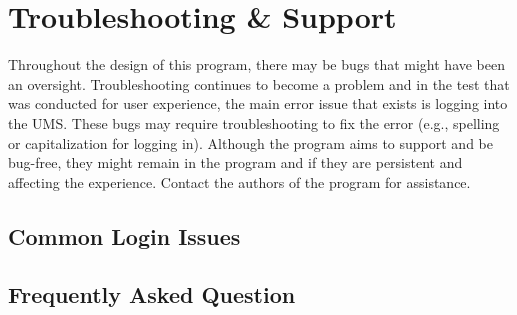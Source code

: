 \newpage
\section{Troubleshooting \& Support}

Throughout the design of this program, there may be bugs that might have been an oversight. Troubleshooting continues to become a problem and in the test that was conducted for user experience, the main error issue that exists is logging into the UMS.  These bugs may require troubleshooting to fix the error (e.g., spelling or capitalization for logging in). Although the program aims to support and be bug-free, they might remain in the program and if they are persistent and affecting the experience. Contact the authors of the program for assistance.



\subsection{Common Login Issues}


\subsection{Frequently Asked Question}

